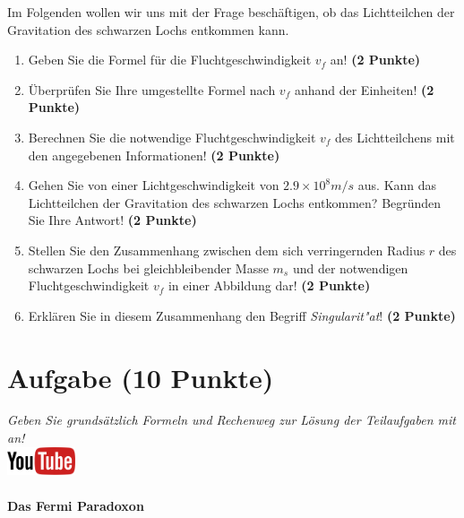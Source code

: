 \documentclass[a4paper, 10pt]{scrartcl}\usepackage[]{graphicx}\usepackage[]{xcolor}
\begin{document}
Im Folgenden wollen wir uns mit der Frage besch{\"a}ftigen, ob das
Lichtteilchen der Gravitation des schwarzen Lochs entkommen kann.

\begin{enumerate}
\item Geben Sie die Formel f{\"u}r die Fluchtgeschwindigkeit $v_f$ an! 
  \textbf{(2 Punkte)}
\item {\"U}berpr{\"u}fen Sie Ihre umgestellte Formel nach $v_f$ anhand der Einheiten!
  \textbf{(2 Punkte)} 
\item Berechnen Sie die notwendige Fluchtgeschwindigkeit $v_f$ des
  Lichtteilchens mit den angegebenen Informationen! \textbf{(2 Punkte)}
\item Gehen Sie von einer Lichtgeschwindigkeit von $\ensuremath{2.9\times 10^{8}}m/s$
  aus. Kann das Lichtteilchen der Gravitation des schwarzen Lochs
  entkommen? Begr{\"u}nden Sie Ihre Antwort! \textbf{(2 Punkte)}
\item Stellen Sie den Zusammenhang zwischen dem sich verringernden Radius
  $r$ des schwarzen Lochs bei gleichbleibender Masse $m_s$
  und der notwendigen Fluchtgeschwindigkeit $v_f$ in einer Abbildung dar!
  \textbf{(2 Punkte)}
\item Erkl{\"a}ren Sie in diesem Zusammenhang den Begriff
  \textit{Singularit{"a}t}! \textbf{(2 Punkte)} 
\end{enumerate}

 
\clearpage

\section{Aufgabe \hfill (10 Punkte)}

\textit{Geben Sie grunds{\"a}tzlich Formeln und Rechenweg zur L{\"o}sung der
  Teilaufgaben mit an!} \\[1Ex]

\hfill\href{https://youtu.be/iCQogS6KhPM}{\includegraphics[width =
  2cm]{img/youtube}} %
\hspace{2Ex}

\paragraph{Das Fermi Paradoxon}
\end{document}
